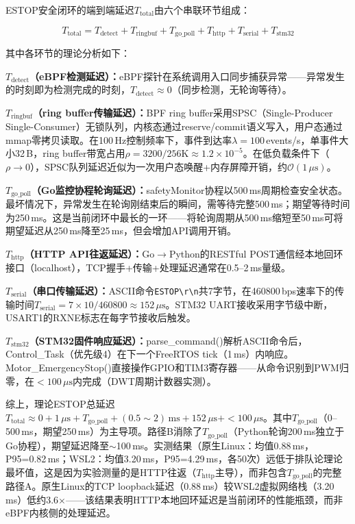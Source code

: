 \documentclass{rjthesis}
\begin{document}
ESTOP安全闭环的端到端延迟$T_{\text{total}}$由六个串联环节组成：

\begin{equation}
    T_{\text{total}} = T_{\text{detect}} + T_{\text{ringbuf}} + T_{\text{go\_poll}} + T_{\text{http}} + T_{\text{serial}} + T_{\text{stm32}}
    \label{eq:estop_chain}
\end{equation}

其中各环节的理论分析如下：

\textbf{$T_{\text{detect}}$（eBPF检测延迟）：}eBPF探针在系统调用入口同步捕获异常——异常发生的时刻即为检测完成的时刻，$T_{\text{detect}}\approx 0$（同步检测，无轮询等待）。

\textbf{$T_{\text{ringbuf}}$（ring buffer传输延迟）：}BPF ring buffer采用SPSC（Single-Producer Single-Consumer）无锁队列\cite{gregg2019}，内核态通过reserve/commit语义写入，用户态通过mmap零拷贝读取。在100\,Hz控制频率下，事件到达率$\lambda=100$\,events/s，单事件大小32\,B，ring buffer带宽占用$\rho=3200/256\text{K}\approx 1.2\times10^{-5}$。在低负载条件下（$\rho\to 0$），SPSC队列延迟近似为一次用户态唤醒+内存屏障开销，约$\mathcal{O}(1\,\mu\text{s})$。

\textbf{$T_{\text{go\_poll}}$（Go监控协程轮询延迟）：}safetyMonitor协程以500\,ms周期检查安全状态。最坏情况下，异常发生在轮询刚结束后的瞬间，需等待完整500\,ms；期望等待时间为250\,ms。这是当前闭环中最长的一环——将轮询周期从500\,ms缩短至50\,ms可将期望延迟从250\,ms降至25\,ms，但会增加API调用开销。

\textbf{$T_{\text{http}}$（HTTP API往返延迟）：}Go$\to$Python的RESTful POST通信经本地回环接口（localhost），TCP握手+传输+处理延迟通常在0.5--2\,ms量级。

\textbf{$T_{\text{serial}}$（串口传输延迟）：}ASCII命令\texttt{ESTOP\textbackslash r\textbackslash n}共7字节，在460800\,bps速率下的传输时间$T_{\text{serial}}=7\times 10/460800\approx 152\,\mu\text{s}$。STM32 UART接收采用字节级中断，USART1的RXNE标志在每字节接收后触发。

\textbf{$T_{\text{stm32}}$（STM32固件响应延迟）：}parse\_command()解析ASCII命令后，Control\_Task（优先级4）在下一个FreeRTOS tick（1\,ms）内响应。Motor\_EmergencyStop()直接操作GPIO和TIM3寄存器——从命令识别到PWM归零，在$<100\,\mu\text{s}$内完成（DWT周期计数器实测）。

综上，理论ESTOP总延迟$T_{\text{total}} \approx 0 + 1\,\mu\text{s} + T_{\text{go\_poll}} + (0.5\sim 2)\,\text{ms} + 152\,\mu\text{s} + <100\,\mu\text{s}$。其中$T_{\text{go\_poll}}$（0--500\,ms，期望250\,ms）为主导项。路径B消除了$T_{\text{go\_poll}}$（Python轮询200\,ms独立于Go协程），期望延迟降至$\sim$100\,ms。实测结果（原生Linux：均值0.88\,ms，P95=0.82\,ms；WSL2：均值3.20\,ms，P95=4.29\,ms，各50次）远低于排队论理论最坏值，这是因为实验测量的是HTTP往返（$T_{\text{http}}$主导），而非包含$T_{\text{go\_poll}}$的完整路径A。原生Linux的TCP loopback延迟（0.88\,ms）较WSL2虚拟网络栈（3.20\,ms）低约3.6$\times$——该结果表明HTTP本地回环延迟是当前闭环的性能瓶颈，而非eBPF内核侧的处理延迟。
\end{document}
